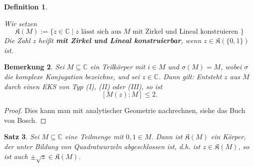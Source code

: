 \documentclass[a4paper, twoside, 11pt, ngerman]{report}
\newcommand{\CC}{\mathds C}
\newcommand{\frakK}{\mathfrak K}
\theoremstyle{definistyle}
\newtheorem{satz}{Satz}[section]
\newtheorem{defini}[satz]{Definition}
\newtheorem{bem}[satz]{Bemerkung}
\theoremstyle{remark}
\newcommand{\defn}[1]{\textit{\bfseries #1}}
\begin{document}
\begin{defini}
\begin{enumerate}
\begin{center}
\end{center}
\end{enumerate}
Wir setzen
\[
\frakK(M):=\{ z\in \CC \mid z \text{ lässt sich aus } M \text{ mit Zirkel und Lineal konstruieren }\}
\]
Die Zahl $z$ heißt \defn{mit Zirkel und Lineal konstruierbar}, wenn
$z\in\frakK(\{0,1\})$ ist.
\end{defini}

\begin{bem}\label{bem:eks_gradzwei}
Sei $M \subseteq \CC$ ein Teilkörper mit $i \in M$ und $\sigma(M) = M$, wobei $\sigma$ die komplexe Konjugation bezeichne, und sei $z \in \CC$. 
Dann gilt: Entsteht $z$ aus $M$ durch einen EKS von Typ (I), (II) oder (III), so ist 
\[
[M(z) : M] \leq 2.
\]
\end{bem}
\begin{proof}
Dies kann man mit analytischer Geometrie nachrechnen, siehe das Buch von Bosch.
\end{proof}

\begin{satz}\label{satz:konstr_eukl_kp}
Sei $M \subseteq \CC$ eine Teilmenge mit $0,1 \in M$.
Dann ist $\frakK(M)$ ein Körper, der unter Bildung von Quadratwurzeln abgeschlossen ist, 
d.h. ist $z \in \frakK(M)$, so ist auch $\pm \sqrt{z} \in \frakK(M)$.
\end{satz}
\end{document}
